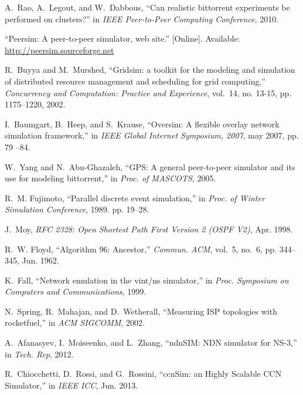 \documentclass[conference]{IEEEtran}
\begin{document}
\begin{thebibliography}{10}
 A.~Rao, A.~Legout, and W.~Dabbous, ``Can realistic
  bittorrent experiments be performed on clusters?'' in \emph{IEEE
    Peer-to-Peer Computing Conference}, 2010.

 \BIBentryALTinterwordspacing ``Peersim: A
  peer-to-peer simulator, web site.'' [Online]. Available:
  \url{http://peersim.sourceforge.net} \BIBentrySTDinterwordspacing

 \BIBentryALTinterwordspacing R.~Buyya and
  M.~Murshed, ``Gridsim: a toolkit for the modeling and simulation of
  distributed resource management and scheduling for grid computing,''
  \emph{Concurrency and Computation: Practice and Experience},
  vol.~14, no.  13-15, pp. 1175--1220, 2002.

 I.~Baumgart, B.~Heep, and S.~Krause, ``Oversim: A
  flexible overlay network simulation framework,'' in \emph{IEEE
    Global Internet Symposium, 2007}, may 2007, pp. 79 --84.

 W.~Yang and N.~Abu-Ghazaleh, ``{GPS}: A general
  peer-to-peer simulator and its use for modeling bittorrent,'' in
  \emph{Proc. of MASCOTS}, 2005.

 \BIBentryALTinterwordspacing
  R.~M. Fujimoto, ``Parallel discrete event simulation,'' in
  \emph{Proc. of Winter Simulation Conference}, 1989. pp. 19--28.

 J.~Moy, \emph{{RFC 2328}: Open Shortest Path First
    Version 2 {(OSPF V2)}}, Apr.  1998.

 \BIBentryALTinterwordspacing
  R.~W. Floyd, ``Algorithm 96: Ancestor,'' \emph{Commun. ACM}, vol.~5,
  no.~6, pp.  344--345, Jun. 1962.

 K.~Fall, ``Network emulation in the vint/ns
  simulator,'' in \emph{Proc. Symposium on Computers and
    Communications}, 1999.

 N.~Spring, R.~Mahajan, and D.~Wetherall,
  ``Measuring {ISP} topologies with rocketfuel,'' in \emph{ACM
    SIGCOMM}, 2002.

 A.~Afanasyev, I.~Moiseenko, and L.~Zhang,
  ``ndnSIM: NDN simulator for NS-3,'' in \emph{Tech. Rep}, 2012.

 R.~Chiocchetti, D.~Rossi, and G.~Rossini,
  ``ccnSim: an Highly Scalable CCN Simulator,'' in \emph{IEEE ICC}, Jun. 2013.

\end{thebibliography}
\end{document}
